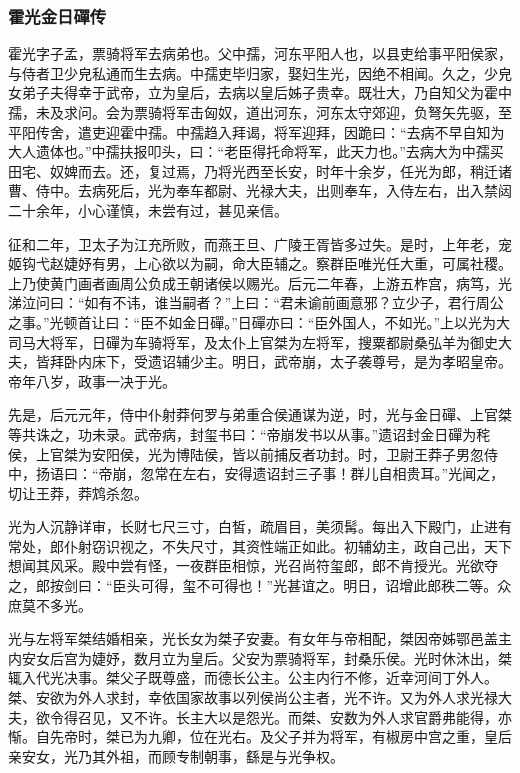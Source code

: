 \documentclass[]{article}
\begin{document}
\hypertarget{header-n5035}{%
\subsubsection{霍光金日磾传}\label{header-n5035}}

霍光字子孟，票骑将军去病弟也。父中孺，河东平阳人也，以县吏给事平阳侯家，与侍者卫少皃私通而生去病。中孺吏毕归家，娶妇生光，因绝不相闻。久之，少皃女弟子夫得幸于武帝，立为皇后，去病以皇后姊子贵幸。既壮大，乃自知父为霍中孺，未及求问。会为票骑将军击匈奴，道出河东，河东太守郊迎，负弩矢先驱，至平阳传舍，遣吏迎霍中孺。中孺趋入拜谒，将军迎拜，因跪曰：``去病不早自知为大人遗体也。''中孺扶报叩头，曰：``老臣得托命将军，此天力也。''去病大为中孺买田宅、奴婢而去。还，复过焉，乃将光西至长安，时年十余岁，任光为郎，稍迁诸曹、侍中。去病死后，光为奉车都尉、光禄大夫，出则奉车，入侍左右，出入禁闼二十余年，小心谨慎，未尝有过，甚见亲信。

征和二年，卫太子为江充所败，而燕王旦、广陵王胥皆多过失。是时，上年老，宠姬钩弋赵婕妤有男，上心欲以为嗣，命大臣辅之。察群臣唯光任大重，可属社稷。上乃使黄门画者画周公负成王朝诸侯以赐光。后元二年春，上游五柞宫，病笃，光涕泣问曰：``如有不讳，谁当嗣者？''上曰：``君未谕前画意邪？立少子，君行周公之事。''光顿首让曰：``臣不如金日磾。''日磾亦曰：``臣外国人，不如光。''上以光为大司马大将军，日磾为车骑将军，及太仆上官桀为左将军，搜粟都尉桑弘羊为御史大夫，皆拜卧内床下，受遗诏辅少主。明日，武帝崩，太子袭尊号，是为孝昭皇帝。帝年八岁，政事一决于光。

先是，后元元年，侍中仆射莽何罗与弟重合侯通谋为逆，时，光与金日磾、上官桀等共诛之，功未录。武帝病，封玺书曰：``帝崩发书以从事。''遗诏封金日磾为秺侯，上官桀为安阳侯，光为博陆侯，皆以前捕反者功封。时，卫尉王莽子男忽侍中，扬语曰：``帝崩，忽常在左右，安得遗诏封三子事！群儿自相贵耳。''光闻之，切让王莽，莽鸩杀忽。

光为人沉静详审，长财七尺三寸，白皙，疏眉目，美须髯。每出入下殿门，止进有常处，郎仆射窃识视之，不失尺寸，其资性端正如此。初辅幼主，政自己出，天下想闻其风采。殿中尝有怪，一夜群臣相惊，光召尚符玺郎，郎不肯授光。光欲夺之，郎按剑曰：``臣头可得，玺不可得也！''光甚谊之。明日，诏增此郎秩二等。众庶莫不多光。

光与左将军桀结婚相亲，光长女为桀子安妻。有女年与帝相配，桀因帝姊鄂邑盖主内安女后宫为婕妤，数月立为皇后。父安为票骑将军，封桑乐侯。光时休沐出，桀辄入代光决事。桀父子既尊盛，而德长公主。公主内行不修，近幸河间丁外人。桀、安欲为外人求封，幸依国家故事以列侯尚公主者，光不许。又为外人求光禄大夫，欲令得召见，又不许。长主大以是怨光。而桀、安数为外人求官爵弗能得，亦惭。自先帝时，桀已为九卿，位在光右。及父子并为将军，有椒房中宫之重，皇后亲安女，光乃其外祖，而顾专制朝事，繇是与光争权。
\end{document}
